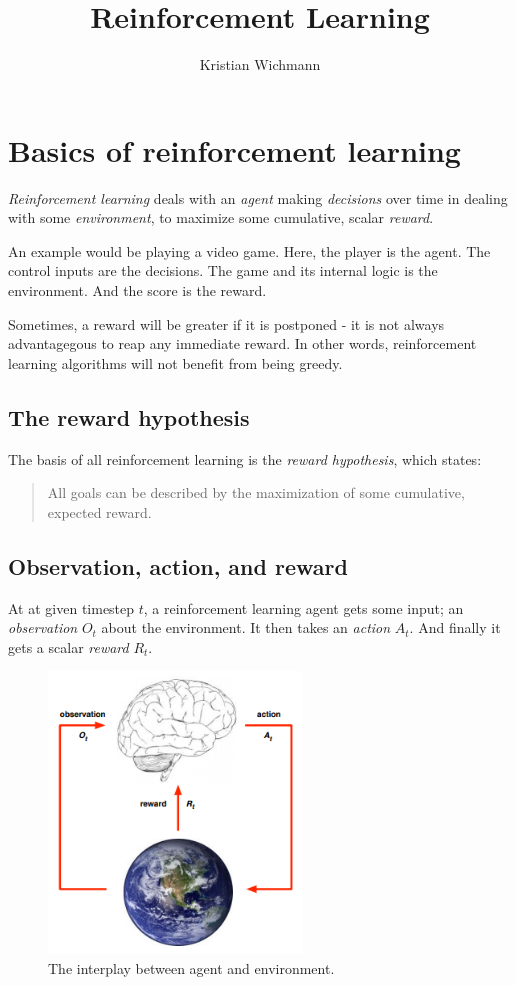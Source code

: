 \documentclass[12pt, a4paper]{article}
\title{Reinforcement Learning}
\author{Kristian Wichmann}
\numberwithin{equation}{section}
\begin{document}
\maketitle

\section{Basics of reinforcement learning}
\textit{Reinforcement learning} deals with an \textit{agent} making \textit{decisions} over time in dealing with some \textit{environment}, to maximize some cumulative, scalar \textit{reward}.

An example would be playing a video game. Here, the player is the agent. The control inputs are the decisions. The game and its internal logic is the environment. And the score is the reward.

Sometimes, a reward will be greater if it is postponed - it is not always advantagegous to reap any immediate reward. In other words, reinforcement learning algorithms will not benefit from being greedy.

\subsection{The reward hypothesis}
The basis of all reinforcement learning is the \textit{reward hypothesis}, which states:

\begin{quotation}
All goals can be described by the maximization of some cumulative, expected reward.
\end{quotation}

\subsection{Observation, action, and reward}
At at given timestep $t$, a reinforcement learning agent gets some input; an \textit{observation} $O_t$ about the environment. It then takes an \textit{action} $A_t$. And finally it gets a scalar \textit{reward} $R_t$.

\begin{figure}
\centering
\includegraphics[width=0.6\textwidth]{agent_environment}
\caption{The interplay between agent and environment.}
\label{fig:agent_environment}
\end{figure}
\end{document}
